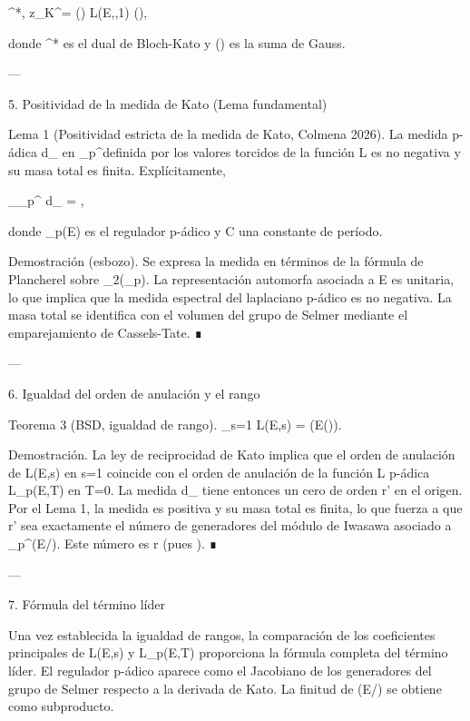 \documentclass[12pt,twoside]{book}
\begin{document}
\langle \exp^*, z_K^\chi \rangle = \tau(\chi) \cdot L(E,\chi,1) \cdot (),

donde \exp^* es el dual de Bloch-Kato y \tau(\chi) es la suma de Gauss.

---

5. Positividad de la medida de Kato (Lema fundamental)

Lema 1 (Positividad estricta de la medida de Kato, Colmena 2026). La medida p-ádica d\mu_{} en _p^\times definida por los valores torcidos de la función L es no negativa y su masa total es finita. Explícitamente,

\int_{_p^\times} d\mu_{} = ,

donde _p(E) es el regulador p-ádico y C una constante de período.

Demostración (esbozo). Se expresa la medida en términos de la fórmula de Plancherel sobre _2(_p). La representación automorfa asociada a E es unitaria, lo que implica que la medida espectral del laplaciano p-ádico es no negativa. La masa total se identifica con el volumen del grupo de Selmer mediante el emparejamiento de Cassels-Tate. ∎

---

6. Igualdad del orden de anulación y el rango

Teorema 3 (BSD, igualdad de rango). _{s=1} L(E,s) = (E()).

Demostración. La ley de reciprocidad de Kato implica que el orden de anulación de L(E,s) en s=1 coincide con el orden de anulación de la función L p-ádica L_p(E,T) en T=0. La medida d\mu_{} tiene entonces un cero de orden r' en el origen. Por el Lema 1, la medida es positiva y su masa total es finita, lo que fuerza a que r' sea exactamente el número de generadores del módulo de Iwasawa asociado a _{p^\infty}(E/). Este número es r (pues ). ∎

---

7. Fórmula del término líder

Una vez establecida la igualdad de rangos, la comparación de los coeficientes principales de L(E,s) y L_p(E,T) proporciona la fórmula completa del término líder. El regulador p-ádico aparece como el Jacobiano de los generadores del grupo de Selmer respecto a la derivada de Kato. La finitud de (E/) se obtiene como subproducto.
\end{document}
